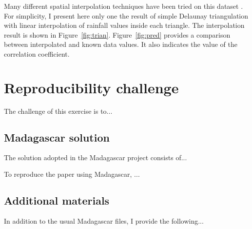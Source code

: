 Many different spatial interpolation techniques have been tried on
this dataset \cite[]{dubois,Fomel.sepphd.107}. For simplicity, I
present here only one the result of simple Delaunay triangulation with
linear interpolation of rainfall values inside each triangle. The
interpolation result is shown in
Figure~\ref{fig:trian}. Figure~\ref{fig:pred} provides a comparison
between interpolated and known data values. It also indicates the
value of the correlation coefficient.



\section{Reproducibility challenge}

The challenge of this exercise is to...

\subsection{Madagascar solution}

The solution adopted in the Madagascar project consists of...

To reproduce the paper using Madagascar, ...

\subsection{Additional materials}

In addition to the usual Madagascar files, I provide the following...



